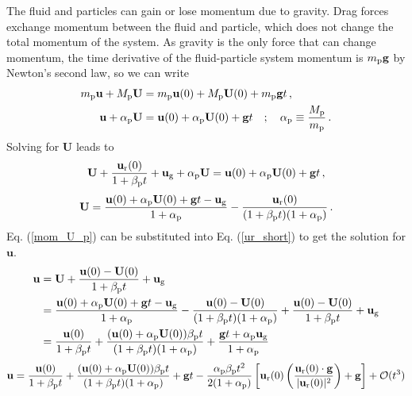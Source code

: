 The fluid and particles can gain or lose momentum due to gravity. Drag forces exchange momentum between the fluid and particle, which does not change the total momentum of the system. As gravity is the only force that can change momentum, the time derivative of the fluid-particle system momentum is $m_{\rm p} \mathbf{g}$ by Newton's second law, so we can write
\begin{align}
    m_{\rm p} \mathbf{u} + M_{\rm p} \mathbf{U} &= m_{\rm p} \mathbf{u}(0) + M_{\rm p} \mathbf{U}(0) + m_{\rm p} \mathbf{g} t \,, \\
    \label{part_mom_cons}
    \mathbf{u} + \alpha_{\rm p} \mathbf{U} &= \mathbf{u}(0) + \alpha_{\rm p} \mathbf{U}(0) + \mathbf{g} t \quad ; \quad \alpha_{\rm p} \equiv \frac{M_{\rm p}}{m_{\rm p}} \,.
\end{align}
Solving for $\mathbf{U}$ leads to
\begin{align*}
    \mathbf{U} + \frac{\mathbf{u}_{\text{r}}(0)}{1 + \beta_{\rm p} t} + \mathbf{u}_\text{g} + \alpha_{\rm p} \mathbf{U} = \mathbf{u}(0) + \alpha_{\rm p} \mathbf{U}(0) + \mathbf{g} t \,,
\end{align*}
\begin{align}
    \label{mom_U_p}
    \mathbf{U} = \frac{\mathbf{u}(0) + \alpha_{\rm p} \mathbf{U}(0) + \mathbf{g} t - \mathbf{u}_\text{g}}{1 + \alpha_{\rm p}} - \frac{\mathbf{u}_{\text{r}}(0)}{(1 + \beta_{\rm p} t)(1 + \alpha_{\rm p})} \,.
\end{align}
Eq. (\ref{mom_U_p}) can be substituted into Eq. (\ref{ur_short}) to get the solution for $\mathbf{u}$.
\begin{align*}
    \mathbf{u} &= \mathbf{U} + \frac{\mathbf{u}(0) - \mathbf{U}(0)}{1 + \beta_{\rm p} t} + \mathbf{u}_\text{g} \\
    &= \frac{\mathbf{u}(0) + \alpha_{\rm p} \mathbf{U}(0) + \mathbf{g} t - \mathbf{u}_\text{g}}{1 + \alpha_{\rm p}} - \frac{\mathbf{u}(0) - \mathbf{U}(0)}{(1 + \beta_{\rm p} t)(1 + \alpha_{\rm p})} + \frac{\mathbf{u}(0) - \mathbf{U}(0)}{1 + \beta_{\rm p} t} + \mathbf{u}_\text{g} \\
    &= \frac{\mathbf{u}(0)}{1 + \beta_{\rm p} t} + \frac{(\mathbf{u}(0) + \alpha_{\rm p} \mathbf{U}(0))\beta_{\rm p} t}{(1 + \beta_{\rm p} t)(1 + \alpha_{\rm p})} + \frac{\mathbf{g} t + \alpha_{\rm p} \mathbf{u}_\text{g}}{1 + \alpha_{\rm p}}
\end{align*}
\begin{align}
    \label{mom_u_p_full}
    \mathbf{u} = \frac{\mathbf{u}(0)}{1 + \beta_{\rm p} t} + \frac{(\mathbf{u}(0) + \alpha_{\rm p} \mathbf{U}(0))\beta_{\rm p} t}{(1 + \beta_{\rm p} t)(1 + \alpha_{\rm p})} + \mathbf{g} t - \frac{\alpha_{\rm p} \beta_{\rm p} t^2}{2 (1 + \alpha_{\rm p})} \left[\mathbf{u}_{\text{r}}(0) \left(\frac{\mathbf{u}_{\text{r}}(0) \cdot \mathbf{g}}{|\mathbf{u}_{\text{r}}(0)|^2}\right) + \mathbf{g}\right] + \mathcal{O}(t^3)
\end{align}
